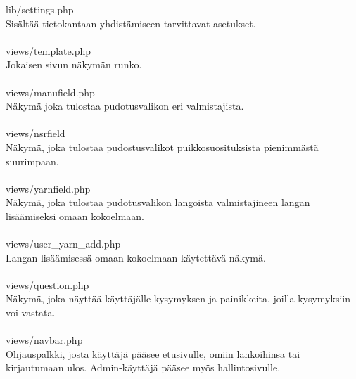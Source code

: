 \documentclass[12pt]{article}
\begin{document}
lib/settings.php\\
Sisältää tietokantaan yhdistämiseen tarvittavat asetukset.\\
\ \\
views/template.php\\
Jokaisen sivun näkymän runko.\\
\ \\
views/manufield.php\\
Näkymä joka tulostaa pudotusvalikon eri valmistajista.\\
\ \\
views/nsrfield\\ 
Näkymä, joka tulostaa pudostusvalikot puikkosuosituksista pienimmästä suurimpaan.\\
\ \\
views/yarnfield.php\\
Näkymä, joka tulostaa pudotusvalikon langoista valmistajineen langan lisäämiseksi omaan kokoelmaan.\\
\ \\
views/user\_yarn\_add.php\\
Langan lisäämisessä omaan kokoelmaan käytettävä näkymä.\\
\ \\
views/question.php\\
Näkymä, joka näyttää käyttäjälle kysymyksen ja painikkeita, joilla kysymyksiin voi vastata.\\
\ \\
views/navbar.php\\
Ohjauspalkki, josta käyttäjä pääsee etusivulle, omiin lankoihinsa tai kirjautumaan ulos. Admin-käyttäjä pääsee myös hallintosivulle.\\
\end{document}
